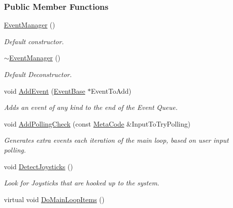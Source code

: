 \subsubsection*{Public Member Functions}
\begin{DoxyCompactItemize}
\item 
\hyperlink{classMezzanine_1_1EventManager_a95ce9d2d865b0d8d9468448969b0ade2}{EventManager} ()
\begin{DoxyCompactList}\small\item\em Default constructor. \item\end{DoxyCompactList}\item 
\hyperlink{classMezzanine_1_1EventManager_a39b9e0f783c2ab0d39f5574a7a106141}{$\sim$EventManager} ()
\begin{DoxyCompactList}\small\item\em Default Deconstructor. \item\end{DoxyCompactList}\item 
void \hyperlink{classMezzanine_1_1EventManager_aa791c61d2665422614d54c7653e87e88}{AddEvent} (\hyperlink{classMezzanine_1_1EventBase}{EventBase} $\ast$EventToAdd)
\begin{DoxyCompactList}\small\item\em Adds an event of any kind to the end of the Event Queue. \item\end{DoxyCompactList}\item 
void \hyperlink{classMezzanine_1_1EventManager_a2da4ef46b2ce56206412782eec43d93e}{AddPollingCheck} (const \hyperlink{classMezzanine_1_1MetaCode}{MetaCode} \&InputToTryPolling)
\begin{DoxyCompactList}\small\item\em Generates extra events each iteration of the main loop, based on user input polling. \item\end{DoxyCompactList}\item 
void \hyperlink{classMezzanine_1_1EventManager_a3cf0fd9e33392aa24e9a735363212185}{DetectJoysticks} ()
\begin{DoxyCompactList}\small\item\em Look for Joysticks that are hooked up to the system. \item\end{DoxyCompactList}\item 
virtual void \hyperlink{classMezzanine_1_1EventManager_a69d44403974ed8d974846e929eb8adda}{DoMainLoopItems} ()

\end{DoxyCompactItemize}
